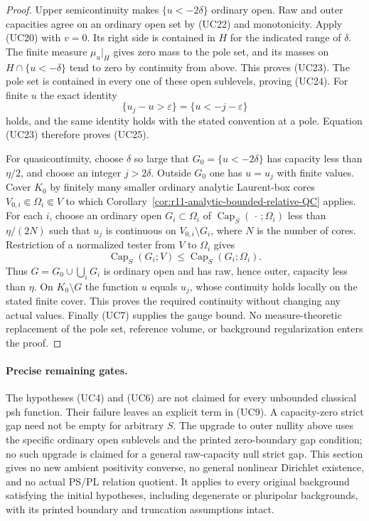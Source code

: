 \documentclass[11pt,a4paper]{article}
\numberwithin{equation}{section}
\theoremstyle{definition}
\theoremstyle{remark}
\begin{document}
\begin{proof}
Upper semicontinuity makes $\{u<-2\delta\}$ ordinary open.
Raw and outer capacities agree on an ordinary open set by (UC22)
and monotonicity. Apply (UC20) with $v=0$. Its right side is
contained in $H$ for the indicated range of $\delta$.
The finite measure $\mu_u|_H$ gives zero mass to the pole set,
and its masses on $H\cap\{u<-\delta\}$ tend to zero by
continuity from above. This proves (UC23). The pole set is
contained in every one of these open sublevels, proving (UC24).
For finite $u$ the exact identity
\[
                   \{u_j-u>\varepsilon\}
                         =\{u<-j-\varepsilon\}
\]
holds, and the same identity holds with the stated convention at
a pole. Equation (UC23) therefore proves (UC25).

For quasicontinuity, choose $\delta$ so large that
$G_0=\{u<-2\delta\}$ has capacity less than $\eta/2$, and
choose an integer $j>2\delta$. Outside $G_0$ one has $u=u_j$
with finite values. Cover $K_0$ by finitely many smaller ordinary
analytic Laurent-box cores $V_{0,i}\Subset\Omega_i\Subset V$ to
which Corollary~\ref{cor:r11-analytic-bounded-relative-QC} applies.
For each $i$,
choose an ordinary open $G_i\subset\Omega_i$ of
$\operatorname{Cap}_S(\,\cdot\,;\Omega_i)$ less than
$\eta/(2N)$ such that $u_j$ is continuous on
$V_{0,i}\setminus G_i$, where $N$ is the number of cores.
Restriction of a normalized tester from $V$ to $\Omega_i$ gives
\[
 \operatorname{Cap}_S(G_i;V)
                  \leq\operatorname{Cap}_S(G_i;\Omega_i).
\]
Thus $G=G_0\cup\bigcup_iG_i$ is ordinary open and has raw,
hence outer, capacity less than $\eta$. On $K_0\setminus G$
the function $u$ equals $u_j$, whose continuity holds locally
on the stated finite cover. This proves the required continuity
without changing any actual values. Finally (UC7) supplies the
gauge bound. No measure-theoretic replacement of the pole set,
reference volume, or background regularization enters the proof.
\end{proof}

\paragraph{Precise remaining gates.}
The hypotheses (UC4) and (UC6) are not claimed for every
unbounded classical psh function. Their failure leaves an explicit
term in (UC9). A capacity-zero strict gap need not be empty for
arbitrary $S$. The upgrade to outer nullity above uses the specific
ordinary open sublevels and the printed zero-boundary gap condition;
no such upgrade is claimed for a general raw-capacity null strict gap.
This section gives no new
ambient positivity converse, no general nonlinear Dirichlet
existence, and no actual PS/PL relation quotient. It applies to
every original background satisfying the initial hypotheses,
including degenerate or pluripolar backgrounds, with its printed
boundary and truncation assumptions intact.
\end{document}
